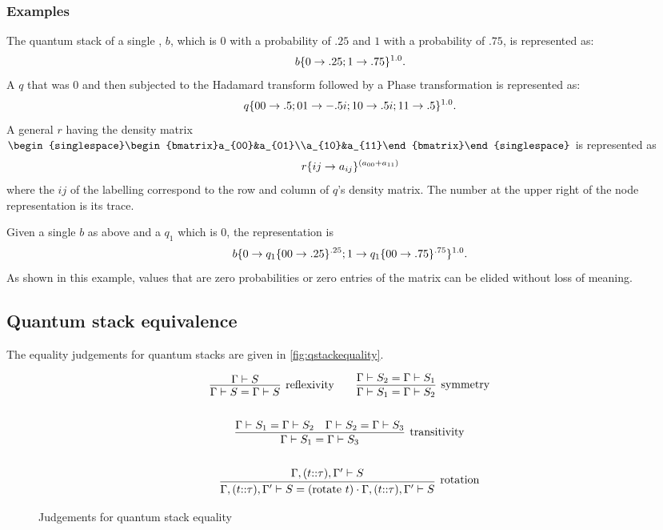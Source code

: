 \subsubsection{Examples}

The quantum stack of a single \bit{}, $b$, which is $0$ with a probability
of $.25$ and $1$ with a probability of $.75$, is represented as: 
\[b\{0\to {.25};1\to {.75}\}^{1.0}.\]
A \qbit{} $q$ that was $0$ and then subjected to the Hadamard transform 
followed by a Phase transformation
is represented as:
\[q\{00\to {.5};01\to {-.5i};10\to {.5i};11\to {.5}\}^{1.0}.\]
A general \qbit{} $r$ having the density matrix $\begin{singlespace}\begin{bmatrix}a_{00}&a_{01}\\a_{10}&a_{11}\end{bmatrix}\end{singlespace}$ is
represented as
\[r\{{ij}\to {a_{ij}}\}^{(a_{00} + a_{11})}\]
where the $ij$ of the labelling correspond to
 the row and column of $q$'s density matrix.
The number at the upper right of the node representation is its trace.

Given a single \bit{} $b$ as above and a \qbit{} $q_1$ which is $0$,
the representation is
\[b\{0\to {\ensuremath{q_1\{{00}\to {.25}\}^{.25}}};1\to {\ensuremath{q_1\{{00}\to {.75}\}^{.75}}}\}^{1.0}.\]
As shown in this example,
 values that are zero probabilities or zero entries of the 
matrix can be elided without loss of meaning. 

\subsection{Quantum stack equivalence}\label{subsec:quantumstackequivalance}
The equality judgements for quantum stacks are given in 
\vref{fig:qstackequality}.
\begin{figure}[htbp]
\[
\begin{gathered}
\infer[\text{reflexivity}]
	{ \Gamma \qentail S = \Gamma\qentail S}{\Gamma\qentail S} \qquad
\infer[\text{symmetry}]
	{\Gamma\qentail S_1 = \Gamma\qentail S_2}
        {\Gamma\qentail S_2 = \Gamma\qentail S_1}\\ 
\\
\infer[\text{transitivity}]
	{\Gamma\qentail S_1 = \Gamma\qentail S_3}
        {\Gamma\qentail S_1 = \Gamma\qentail S_2 & \Gamma\qentail S_2 = \Gamma\qentail S_3}\\
\\\infer[\raisebox{1ex}{rotation}]
	{ \Gamma,(t{::}\tau),\Gamma'\qentail S =
     \qop{(\text{rotate }t)}{\Gamma,(t{::}\tau),\Gamma'\qentail S }}
{\Gamma,(t{::}\tau),\Gamma'\qentail S}
\end{gathered}
\]
\caption{Judgements  for quantum stack equality}\label{fig:qstackequality}
\end{figure}


